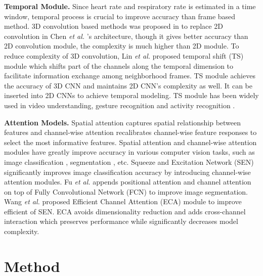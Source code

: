 \documentclass[conference]{IEEEtran}
\newcommand{\etal}{\textit{et al}.}
\begin{document}
\textbf{Temporal Module.} 
Since heart rate and respiratory rate is estimated in a time window, temporal process is crucial to improve accuracy than frame based method. 3D convolution based methods was proposed in \cite{liu2020multi} to replace 2D convolution in Chen \textit{et al.} \cite{chen2018deepphys}'s architecture, though it gives better accuracy than 2D convolution module, the complexity is much higher than 2D module. To reduce complexity of 3D convolution, Lin \textit{et al.} \cite{lin2019temporal} proposed temporal shift (TS) module which shifts part of the channels along the temporal dimension to facilitate information exchange among neighborhood frames. TS module achieves the accuracy of 3D CNN and maintains 2D CNN’s complexity as well. It can be inserted into 2D CNNs to achieve temporal modeling. TS module has been widely used in video understanding\cite{lin2019tsm}, gesture recognition \cite{li2019skeleton} and activity recognition \cite{wu2021action}.  

\textbf{Attention Models.}
Spatial attention \cite{jaderberg2015spatial} captures spatial relationship between features and channel-wise attention \cite{hu2018squeeze} recalibrates channel-wise feature responses to select the most informative features. Spatial attention and channel-wise attention modules have greatly improve accuracy in various computer vision tasks, such as image classification \cite{hu2018squeeze}, segmentation \cite{fu2019dual}, etc. Squeeze and Excitation Network (SEN) \cite{hu2018squeeze} significantly improves image classification accuracy by introducing channel-wise attention modules. Fu \textit{et al.} \cite{fu2019dual} appends positional attention and channel attention on top of Fully Convolutional Network (FCN) \cite{long2015fully} to improve image segmentation. Wang \textit{et al.} \cite{wang2020eca} proposed Efficient Channel Attention (ECA) module to improve efficient of SEN. ECA avoids dimensionality reduction and adds cross-channel interaction which preserves performance while significantly decreases model complexity.


\section{Method}
\label{sec:method}
\end{document}

